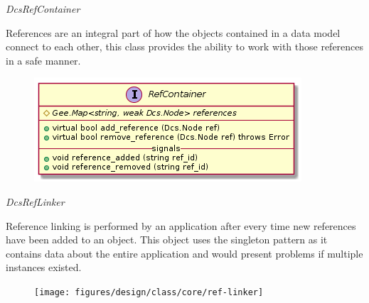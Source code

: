       \emph{DcsRefContainer}

      \vspace*{-0.75cm}
      \begin{minipage}[t]{0.5\textwidth}
      	\vspace*{0.5cm}
        References are an integral part of how the objects contained in a data
        model connect to each other, this class provides the ability to work
        with those references in a safe manner.
      \end{minipage} \hfill
      \begin{minipage}[t]{0.45\textwidth}
        \begin{figure}[H]
          \includegraphics[width=\textwidth]{figures/design/class/core/ref-container}
          \label{fig:dsg-classes-ref-container}
        \end{figure}
      \end{minipage}

      \emph{DcsRefLinker}

      \vspace*{-0.75cm}
      \begin{minipage}[t]{0.5\textwidth}
      	\vspace*{0.5cm}
        Reference linking is performed by an application after every time new
        references have been added to an object. This object uses the singleton
        pattern as it contains data about the entire application and would
        present problems if multiple instances existed.
      \end{minipage} \hfill
      \begin{minipage}[t]{0.45\textwidth}
        \begin{figure}[H]
          \texttt{[image: figures/design/class/core/ref-linker]}
          \label{fig:dsg-classes-ref-linker}
        \end{figure}
      \end{minipage}


